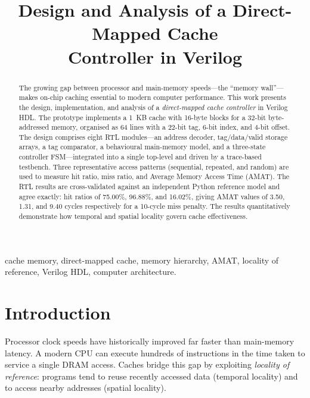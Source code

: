 \documentclass[conference]{IEEEtran}
\begin{document}
\title{Design and Analysis of a Direct-Mapped Cache\\ Controller in Verilog}


\maketitle

\begin{abstract}
The growing gap between processor and main-memory speeds---the ``memory
wall''---makes on-chip caching essential to modern computer performance. This
work presents the design, implementation, and analysis of a \emph{direct-mapped
cache controller} in Verilog HDL. The prototype implements a 1~KB cache with
16-byte blocks for a 32-bit byte-addressed memory, organised as 64 lines with a
22-bit tag, 6-bit index, and 4-bit offset. The design comprises eight RTL
modules---an address decoder, tag/data/valid storage arrays, a tag comparator,
a behavioural main-memory model, and a three-state controller FSM---integrated
into a single top-level and driven by a trace-based testbench. Three
representative access patterns (sequential, repeated, and random) are used to
measure hit ratio, miss ratio, and Average Memory Access Time (AMAT). The RTL
results are cross-validated against an independent Python reference model and
agree exactly: hit ratios of 75.00\%, 96.88\%, and 16.02\%, giving AMAT values
of 3.50, 1.31, and 9.40 cycles respectively for a 10-cycle miss penalty. The
results quantitatively demonstrate how temporal and spatial locality govern
cache effectiveness.
\end{abstract}

\begin{IEEEkeywords}
cache memory, direct-mapped cache, memory hierarchy, AMAT, locality of
reference, Verilog HDL, computer architecture.
\end{IEEEkeywords}

\section{Introduction}
Processor clock speeds have historically improved far faster than main-memory
latency. A modern CPU can execute hundreds of instructions in the time taken to
service a single DRAM access. Caches bridge this gap by exploiting
\emph{locality of reference}: programs tend to reuse recently accessed data
(temporal locality) and to access nearby addresses (spatial locality).
\end{document}
